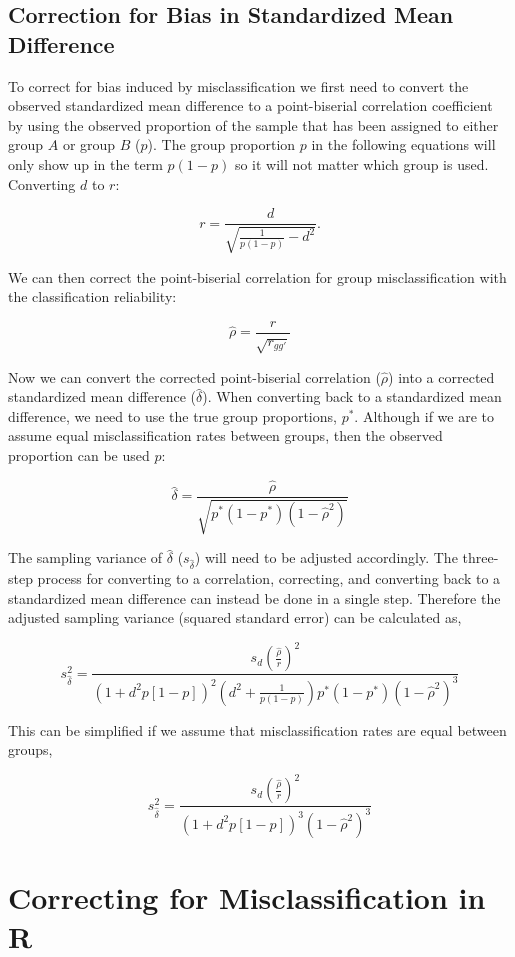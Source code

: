 \documentclass[
  letterpaper,
  DIV=11,
  numbers=noendperiod]{scrreprt}
\begin{document}
\hypertarget{sec-corrections}{%
\subsection{Correction for Bias in Standardized Mean
Difference}\label{sec-corrections}}

To correct for bias induced by misclassification we first need to
convert the observed standardized mean difference to a point-biserial
correlation coefficient by using the observed proportion of the sample
that has been assigned to either group \(A\) or group \(B\) (\(p\)). The
group proportion \(p\) in the following equations will only show up in
the term \(p(1-p)\) so it will not matter which group is used.
Converting \(d\) to \(r\):

\[
r = \frac{d}{\sqrt{\frac{1}{p(1-p)}-d^2}}.
\]

We can then correct the point-biserial correlation for group
misclassification with the classification reliability:

\[
\hat{\rho} = \frac{r}{\sqrt{r_{gg'}}}
\]

Now we can convert the corrected point-biserial correlation
(\(\hat{\rho}\)) into a corrected standardized mean difference
(\(\hat{\delta}\)). When converting back to a standardized mean
difference, we need to use the true group proportions, \(p^*\). Although
if we are to assume equal misclassification rates between groups, then
the observed proportion can be used \(p\):

\[
\hat{\delta} = \frac{\hat{\rho}}{\sqrt{p^*\left(1-p^*\right)\left(1-\hat{\rho}^2\right)}}
\]

The sampling variance of \(\hat{\delta}\) (\(s_{\hat{\delta}}\)) will
need to be adjusted accordingly. The three-step process for converting
to a correlation, correcting, and converting back to a standardized mean
difference can instead be done in a single step. Therefore the adjusted
sampling variance (squared standard error) can be calculated as,

\[
s^2_{\hat{\delta}} = \frac {s_d\left(\frac{\hat{\rho}}{r}\right)^2} {\left(1+d^2p[1-p]\right)^2\left(d^2+\frac{1}{p(1-p)}\right)p^*(1-p^*)(1-\hat{\rho}^2)^3}
\]

This can be simplified if we assume that misclassification rates are
equal between groups,

\[
s^2_{\hat{\delta}} = \frac {s_d\left(\frac{\hat{\rho}}{r}\right)^2} {\left(1+d^2p[1-p]\right)^3(1-\hat{\rho}^2)^3}
\]

\hypertarget{correcting-for-misclassification-in-r}{%
\section{Correcting for Misclassification in
R}\label{correcting-for-misclassification-in-r}}
\end{document}
